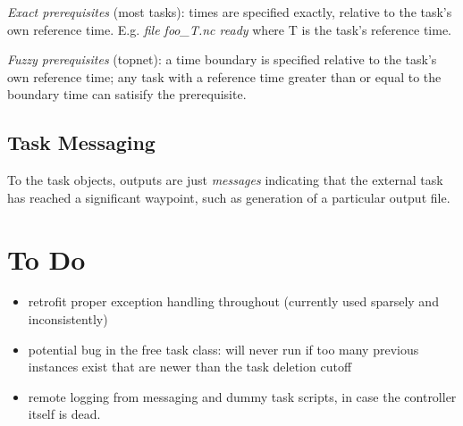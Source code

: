 \documentclass[11pt,a4paper]{article}
\begin{document}
{\em Exact prerequisites} (most tasks): times are specified exactly,
relative to the task's own reference time.  E.g. {\em file foo\_{T}.nc
ready} where T is the task's reference time.

{\em Fuzzy prerequisites} (topnet): a time boundary is specified
relative to the task's own reference time; any task with a reference
time greater than or equal to the boundary time can satisify the
prerequisite.

\subsection{Task Messaging}

To the task objects, outputs are just {\em messages} indicating that the
external task has reached a significant waypoint, such as generation of
a particular output file.

\section{To Do}

\begin{itemize}

\item
 retrofit proper exception handling throughout (currently used sparsely and 
  inconsistently)

\item
 potential bug in the free task class: will never run if too many
 previous instances exist that are newer than the task deletion cutoff

\item
 remote logging from messaging and dummy task scripts, in case the
 controller itself is dead.

\end{itemize}
\end{document}
